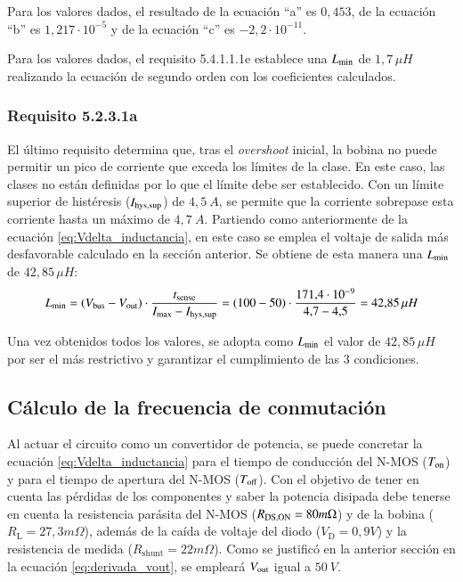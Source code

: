 \documentclass[12pt]{report} %
\begin{document}
Para los valores dados, el resultado de la ecuación ``a'' es $0{,}453$, de la ecuación ``b'' es $1{,}217 \cdot 10^{-5}$ y de la ecuación ``c'' es $-2{,}2\cdot 10^{-11}$. 

Para los valores dados, el requisito 5.4.1.1.1e establece una $L_{\text{min}}$ de $1{,}7\,\mu H$ realizando la ecuación de segundo orden con los coeficientes calculados. 


\subsubsection{Requisito 5.2.3.1a}
El último requisito determina que, tras el \textit{overshoot} inicial, la bobina no puede permitir un pico de corriente que exceda los límites de la clase. En este caso, las clases no están definidas por lo que el límite debe ser establecido. Con un límite superior de histéresis ($I_{\text{hys,sup}}$) de $4{,}5~A$, se permite que la corriente sobrepase esta corriente hasta un máximo de $4{,}7~A$.
Partiendo como anteriormente de la ecuación \ref{eq:Vdelta_inductancia}, en este caso se emplea el voltaje de salida más desfavorable calculado en la sección anterior. Se obtiene de esta manera una $L_{\text{min}}$ de $42{,}85\, \mu H$:
\begin{equation}
    L_{\text{min}} = (V_{\text{bus}}-V_{\text{out}})\cdot\frac{t_\text{sense}}{I_{\text{max}} - I_{\text{hys,sup}}}= (100-50)\cdot\frac{171{,}4\cdot 10^{-9}}{4{,}7-4{,}5}=42{,}85 \, \mu H
    \label{eq:particularizacionImax}
\end{equation}

Una vez obtenidos todos los valores, se adopta como $L_{\text{min}}$ el valor de $42{,}85 \, \mu H$ por ser el más restrictivo y garantizar el cumplimiento de las 3 condiciones. 

\subsection{Cálculo de la frecuencia de conmutación}
\label{subsec:Cálculo de la frecuencia de conmutación}

Al actuar el circuito como un convertidor de potencia, se puede concretar la ecuación \ref{eq:Vdelta_inductancia} para el tiempo de conducción del N-MOS ($T_{\text{on}}$) y para el tiempo de apertura del N-MOS ($T_{\text{off}}$). Con el objetivo de tener en cuenta las pérdidas de los componentes y saber la potencia disipada debe tenerse en cuenta la resistencia parásita del N-MOS ($R_{\text{DS,ON}} = 80 m\Omega$) y de la bobina ($R_\text{L} = 27{,}3 m\Omega$), además de la caída de voltaje del diodo ($V_\text{D}=0{,}9 V$) y la resistencia de medida ($R_\text{shunt} = 22 m\Omega$).
Como se justificó en la anterior sección en la ecuación \ref{eq:derivada_vout}, se empleará $V_{\text{out}}$ igual a $50~V$.  
\end{document}
